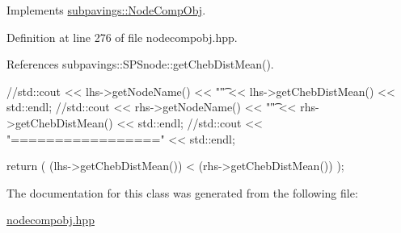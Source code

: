 \-Implements \hyperlink{classsubpavings_1_1NodeCompObj_a121d53049c5ed1c0924313951d6aa630}{subpavings\-::\-Node\-Comp\-Obj}.



\-Definition at line 276 of file nodecompobj.\-hpp.



\-References subpavings\-::\-S\-P\-Snode\-::get\-Cheb\-Dist\-Mean().


\begin{DoxyCode}
      { 
      //std::cout << lhs->getNodeName() << "\t" << lhs->getChebDistMean() <<
       std::endl;
      //std::cout << rhs->getNodeName() << "\t" << rhs->getChebDistMean() <<
       std::endl;
      //std::cout << "=================" << std::endl;
      
      return ( (lhs->getChebDistMean()) < 
            (rhs->getChebDistMean()) );
    }
\end{DoxyCode}


\-The documentation for this class was generated from the following file\-:\begin{DoxyCompactItemize}
\item 
\hyperlink{nodecompobj_8hpp}{nodecompobj.\-hpp}\end{DoxyCompactItemize}
